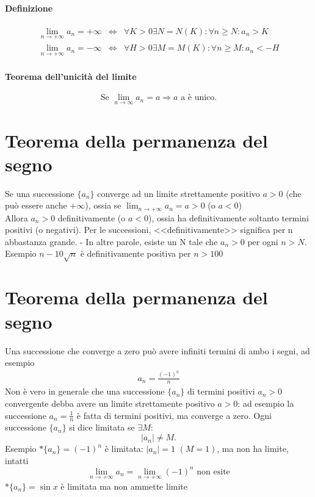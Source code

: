 \paragraph{Definizione}
\begin{eqnarray*}
	\lim_{n\to+\infty}a_n=+\infty&\Leftrightarrow&\forall K>0 \exists N=N(K):\forall n\geq N:a_n>K\\
	\lim_{n\to+\infty}a_n=-\infty&\Leftrightarrow&\forall H>0 \exists M=M(K):\forall n\geq M:a_n<-H
\end{eqnarray*}
\paragraph{Teorema dell'unicità del limite}
\begin{equation*}
	\text{Se } \lim_{n\to \infty} a_n=a\Rightarrow a \text{ a è unico.}
\end{equation*}
\section{Teorema della permanenza del segno}
Se una successione $\{a_n\}$ converge ad un limite strettamente positivo $a>0$ (che può essere anche $+\infty$), ossia se $\lim_{n\to+\infty}a_n=a>0$ (o $a<0$)\\
Allora $a_n>0$ definitivamente (o $a<0$), ossia ha definitivamente soltanto termini positivi (o negativi). Per le successioni, <<definitivamente>> significa per n abbastanza grande. - In altre parole, esiste un N tale che $a_n>0$ per ogni $n>N$. Esempio $n-10\sqrt{n}$ è definitivamente positiva per $n>100$
\section{Teorema della permanenza del segno}
Una successione che converge a zero può avere infiniti termini di ambo i segni, ad esempio
\begin{eqnarray*}
	a_n=\frac{(-1)^n}{n}
\end{eqnarray*}
Non è vero in generale che una successione $\{a_n\}$ di termini positivi $a_n>0$ convergente debba avere un limite strettamente positivo $a>0$: ad esempio la successione $a_n=\frac{1}{n}$ è fatta di termini positivi, ma converge a zero. Ogni successione $\{a_n\}$ si dice limitata se $\exists M$:
\begin{equation*}
	|a_n|\neq M.
\end{equation*}
Esempio $*\{a_n\}=(-1)^n$ è limitata: $|a_n|=1$ $(M=1)$, ma non ha limite, intatti
\begin{equation*}
	\lim_{n\to +\infty}a_n=\lim_{n\to +\infty}(-1)^n\text{ non esite}
\end{equation*} 
$*\{a_n\}=\sin x$ è limitata ma non ammette limite
